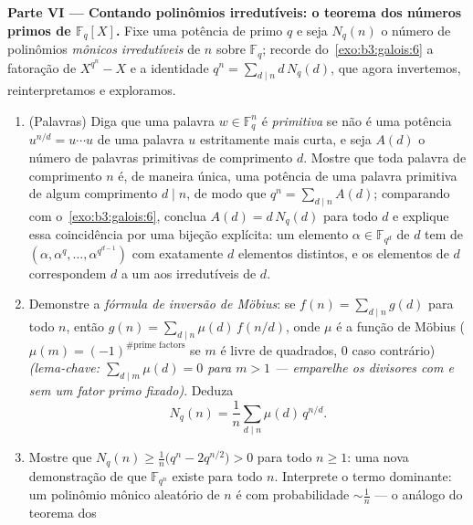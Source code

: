 \begin{problem}
\medskip
\noindent\textbf{Parte VI --- Contando polinômios irredutíveis: o
teorema dos números primos de $\mathbb F_q[X]$.} Fixe uma potência de primo
$q$ e seja $N_q(n)$ o número de polinômios \emph{mônicos
irredutíveis} de  $n$ sobre $\mathbb F_q$; recorde do~\cref{exo:b3:galois:6}
a fatoração de $X^{q^n} - X$ e a identidade $q^n = \sum_{d\mid n}d\,N_q(d)$, que agora invertemos,
reinterpretamos e exploramos.
\begin{enumerate}[resume]
  \item (Palavras) Diga que uma palavra $w \in \mathbb F_q^n$ é \emph{primitiva} se
        não é uma potência $u^{n/d} =
        u\cdots u$ de uma palavra $u$ estritamente
        mais curta, e seja $A(d)$ o número de palavras primitivas
        de comprimento $d$. Mostre que toda palavra de comprimento
        $n$ é, de maneira única, uma potência de uma palavra
        primitiva de algum comprimento $d \mid n$, de modo que $q^n = \sum_{d \mid n}A(d)$;
        comparando com o~\cref{exo:b3:galois:6}, conclua $A(d) = d\,N_q(d)$ para todo
        $d$ e explique essa coincidência por uma bijeção
        explícita: um elemento $\alpha \in
        \mathbb F_{q^d}$ de  $d$ tem  de
         $(\alpha, \alpha^q, \dots, \alpha^{q^{d-1}})$ com exatamente $d$ elementos distintos, e
        os elementos de  $d$ correspondem $d$ a um aos
        irredutíveis de  $d$.
  \item Demonstre a \emph{fórmula de inversão de Möbius}: se $f(n) =
        \sum_{d\mid n}g(d)$
        para todo $n$, então $g(n) =
        \sum_{d\mid n}\mu(d)\,f(n/d)$, onde $\mu$ é a função de
        Möbius ($\mu(m) = (-1)^{\#\text{prime
        factors}}$ se $m$ é livre de quadrados, $0$ caso
        contrário) \emph{(lema-chave: $\sum_{d \mid m}\mu(d) = 0$ para $m >
        1$ ---
        emparelhe os divisores com e sem um fator primo fixado)}.
        Deduza
        \[
        N_q(n) = \frac1n\sum_{d \mid n}\mu(d)\,q^{n/d} .
        \]
  \item Mostre que $N_q(n) \geq \frac1n\bigl(q^n - 2q^{n/2}\bigr) > 0$ para todo $n \geq 1$: uma nova demonstração de que
        $\mathbb F_{q^n}$ existe para todo $n$. Interprete o termo dominante:
        um polinômio mônico aleatório de  $n$ é  com
        probabilidade $\sim \frac1n$ --- o análogo  do teorema dos

\end{enumerate}
\end{problem}
